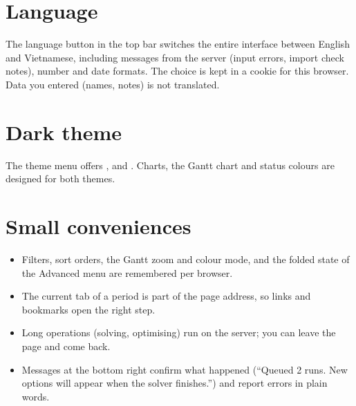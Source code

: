 
\section{Language}


The language button in the top bar switches the entire interface between English and Vietnamese, including
messages from the server (input errors, import check notes), number and date formats. The choice is kept in a
cookie for this browser. Data you entered (names, notes) is not translated.

\section{Dark theme}\label{sec:theme}


The theme menu offers ,  and . Charts, the Gantt chart and status colours are
designed for both themes.

\section{Small conveniences}

\begin{itemize}
  \item Filters, sort orders, the Gantt zoom and colour mode, and the folded state of the Advanced menu are
        remembered per browser.
  \item The current tab of a period is part of the page address, so links and bookmarks open the right step.
  \item Long operations (solving, optimising) run on the server; you can leave the page and come back.
  \item Messages at the bottom right confirm what happened (``Queued 2 runs. New options will appear when the
        solver finishes.'') and report errors in plain words.
\end{itemize}
